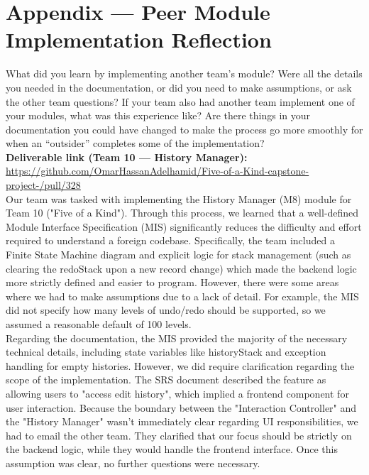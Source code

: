\documentclass[12pt, titlepage]{article}
\begin{document}
\section*{Appendix --- Peer Module Implementation Reflection}

  What did you learn by implementing another team's module? Were all the details you needed in the
  documentation, or did you need to make assumptions, or ask the other team
  questions?  If your team also had another team implement one of your modules,
  what was this experience like?  Are there things in your documentation you
  could have changed to make the process go more smoothly for when an
  ``outsider'' completes some of the implementation? \\

  \noindent\textbf{Deliverable link (Team 10 --- History Manager):} \url{https://github.com/OmarHassanAdelhamid/Five-of-a-Kind-capstone-project-/pull/328}\\

  \noindent Our team was tasked with implementing the History Manager (M8) module for Team 10
  ("Five of a Kind"). Through this process, we learned that a well-defined Module
  Interface Specification (MIS) significantly reduces the difficulty and effort
  required to understand a foreign codebase. Specifically, the team included a Finite
  State Machine diagram and explicit logic for stack management (such as clearing
  the redoStack upon a new record change) which made the backend logic more strictly
  defined and easier to program. However, there were some areas where we had to make
  assumptions due to a lack of detail. For example, the MIS did not specify how many
  levels of undo/redo should be supported, so we assumed a reasonable default of 100 levels. \\

  \noindent Regarding the documentation, the MIS provided the majority of the necessary technical
  details, including state variables like historyStack and exception handling for empty
  histories. However, we did require clarification regarding the scope of the implementation.
  The SRS document described the feature as allowing users to "access edit history", which
  implied a frontend component for user interaction. Because the boundary between the
  "Interaction Controller"  and the "History Manager" wasn't immediately clear regarding
  UI responsibilities, we had to email the other team. They clarified that our focus
  should be strictly on the backend logic, while they would handle the frontend interface.
  Once this assumption was clear, no further questions were necessary.\\
\end{document}
